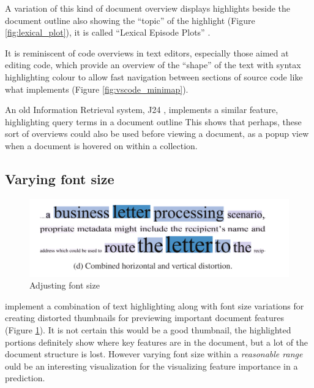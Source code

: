 \documentclass{l4proj}
\begin{document}
A variation of this kind of document overview displays highlights beside the document outline also showing the ``topic'' of the highlight (Figure \ref{fig:lexical_plot}), it is called ``Lexical Episode Plots'' \autocite{el-assadyVisArgueVisualText2016,goldExploratoryTextAnalysis2015}.

It is reminiscent of code overviews in text editors, especially those aimed at editing code, which provide an overview of the ``shape'' of the text with syntax highlighting colour to allow fast navigation between sections of source code like what \textcite{MicrosoftVscode2020} implements (Figure \ref{fig:vscode_minimap}).

An old Information Retrieval system, J24 \autocite[7]{ogdenDocumentThumbnailVisualizations1998}, implements a similar feature, highlighting query terms in a document outline
This shows that perhaps, these sort of overviews could also be used before viewing a document, as a popup view when a document is hovered on within a collection.

\subsection{Varying font size}

\begin{figure}
    \includegraphics[width=\linewidth]{images/document_visualization/font-size.png}
    \caption{Adjusting font size}

    \vspace{-10pt}
    \label{fig:font-size}
\end{figure}

\textcite{stoffelDocumentThumbnailsVariable2012} implement a combination of text highlighting along with font size variations for creating distorted thumbnails for previewing important document features (Figure \ref{fig:font-size}).
It is not certain this would be a good thumbnail, the highlighted portions definitely show where key features are in the document, but a lot of the document structure is lost.
However varying font size within a \textit{reasonable range} ould be an interesting visualization for the visualizing feature importance in a prediction.
\end{document}
